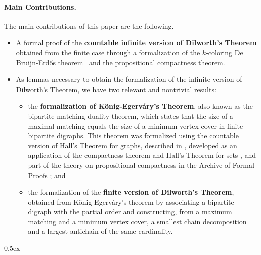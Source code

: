 \documentclass[11pt,a4paper]{article}
\begin{document}
\paragraph{\bf Main Contributions.} 
The main contributions of this paper are the following.
\begin{itemize}
\item A formal proof of the \textbf{countable infinite version of Dilworth's Theorem} obtained from the finite case through a formalization of the $k$-coloring De Bruijn-Erd\H{o}s
  theorem~\cite{deBruijnErdos1951} and the propositional compactness theorem.  

\item As lemmas necessary to obtain the formalization of the infinite version of Dilworth's Theorem, we have two relevant and nontrivial results:
\begin{itemize} 
\item the \textbf{formalization of K\"onig-Egerv\'ary's Theorem}, also known as the bipartite matching duality theorem, which states that the size of a maximal matching equals the size of a minimum vertex cover in finite bipartite digraphs.  This theorem was formalized using the countable version of Hall's Theorem for graphs, described in \cite{Serrano2024}, developed 
as an application of the compactness theorem and Hall's Theorem for sets \cite{Serrano2022}, and part of the theory on propositional compactness in the Archive of Formal Proofs \cite{DBLP:journals/afp/SuarezLA24}; and
\item the formalization of the \textbf{finite version of Dilworth's Theorem}, obtained from K\"onig-Egerv\'ary's theorem by associating a bipartite digraph with the partial order and constructing, from a maximum matching and a minimum vertex cover, a smallest chain decomposition and a largest antichain of the same cardinality.
\end{itemize}
\end{itemize}



\tableofcontents

\parindent 0pt\parskip 0.5ex




%
\end{document}
